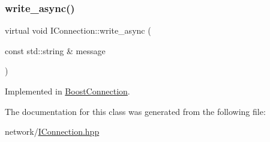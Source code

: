 \mbox{\label{classIConnection_a7210f770ebae6277e98142a8b5a6226f}} 
\subsubsection{\texorpdfstring{write\+\_\+async()}{write\_async()}}
{\footnotesize\ttfamily virtual void I\+Connection\+::write\+\_\+async (\begin{DoxyParamCaption}\item[{const std\+::string \&}]{message }\end{DoxyParamCaption})\hspace{0.3cm}{\ttfamily [pure virtual]}}



Implemented in \mbox{\hyperlink{classBoostConnection_abe7200e60f8b4d909a057f85ca9569db}{Boost\+Connection}}.



The documentation for this class was generated from the following file\+:\begin{DoxyCompactItemize}
\item 
network/\mbox{\hyperlink{IConnection_8hpp}{I\+Connection.\+hpp}}\end{DoxyCompactItemize}
